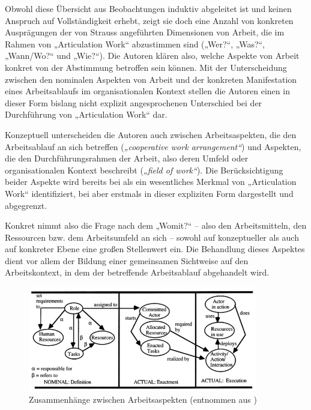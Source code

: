 Obwohl diese Übersicht aus Beobachtungen induktiv abgeleitet ist und keinen Anspruch auf Vollständigkeit erhebt, zeigt sie doch eine Anzahl von konkreten Ausprägungen der von Strauss angeführten Dimensionen von Arbeit, die im Rahmen von „Articulation Work“ abzustimmen sind („Wer?“, „Was?“, „Wann/Wo?“ und „Wie?“). Die Autoren klären also, welche Aspekte von Arbeit konkret von der Abstimmung betroffen sein können. Mit der Unterscheidung zwischen den nominalen Aspekten von Arbeit und der konkreten Manifestation eines Arbeitsablaufs im organisationalen Kontext stellen die Autoren einen in dieser Form bislang nicht explizit angesprochenen Unterschied bei der Durchführung von „Articulation Work“ dar.

Konzeptuell unterscheiden die Autoren auch zwischen Arbeitsaspekten, die den Arbeitsablauf an sich betreffen (\emph{„cooperative work arrangement“}) und Aspekten, die den Durchführungsrahmen der Arbeit, also deren Umfeld oder organisationalen Kontext beschreibt (\emph{„field of work“}). Die Berücksichtigung beider Aspekte wird bereits bei \citet{Strauss88} als ein wesentliches Merkmal von „Articulation Work“ identifiziert, bei \citet{Schmidt96} aber erstmals in dieser expliziten Form dargestellt und abgegrenzt.

Konkret nimmt also die Frage nach dem „Womit?“ -- also den Arbeitsmitteln, den Ressourcen bzw. dem Arbeitsumfeld an sich --  sowohl auf konzeptueller als auch auf konkreter Ebene eine großen Stellenwert ein. Die Behandlung dieses Aspektes dient vor allem der Bildung einer gemeinsamen Sichtweise auf den Arbeitskontext, in dem der betreffende Arbeitsablauf abgehandelt wird.

\begin{figure}[htbp]
	\centering
		\includegraphics[width=10cm]{img/ArticulationWork/divitini00_caw.png}
	\caption[Zusammenhänge zwischen Arbeitsaspekten]{Zusammenhänge zwischen Arbeitsaspekten (entnommen aus \citep{Divitini00})}
	\label{fig:img_ArticulationWork_divitini00_caw}
\end{figure}

